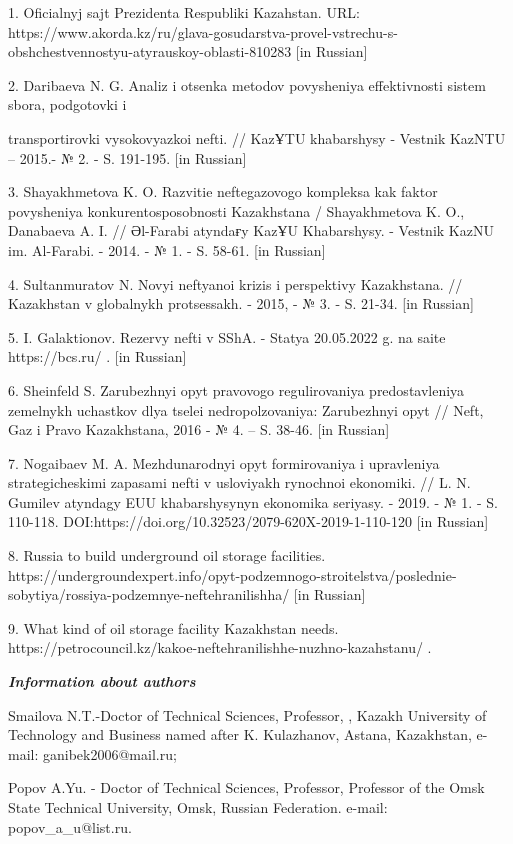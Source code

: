 \begin{noparindent}
1. Oficial\textquotesingle nyj sajt Prezidenta Respubliki Kazahstan.
URL:
https://www.akorda.kz/ru/glava-gosudarstva-provel-vstrechu-s-obshchestvennostyu-atyrauskoy-oblasti-810283
{[}in Russian{]}

2. Daribaeva N. G. Analiz i otsenka metodov povysheniya effektivnosti
sistem sbora, podgotovki i

transportirovki vysokovyazkoi nefti. //
KazҰTU khabarshysy - Vestnik KazNTU -- 2015.- № 2. - S. 191-195. {[}in
Russian{]}

3. Shayakhmetova K. O. Razvitie neftegazovogo kompleksa kak faktor
povysheniya konkurentosposobnosti Kazakhstana / Shayakhmetova K. O.,
Danabaeva A. I. // Әl-Farabi atyndaғy KazҰU Khabarshysy. - Vestnik KazNU
im. Al\textquotesingle-Farabi. - 2014. - № 1. - S. 58-61. {[}in
Russian{]}

4. Sultanmuratov N. Novyi neftyanoi krizis i perspektivy Kazakhstana. //
Kazakhstan v global\textquotesingle nykh protsessakh. - 2015, - № 3. -
S. 21-34. {[}in Russian{]}

5. I. Galaktionov. Rezervy nefti v SShA. - Stat\textquotesingle ya
20.05.2022 g. na saite https://bcs.ru/ . {[}in Russian{]}

6. Sheinfel\textquotesingle d S. Zarubezhnyi opyt pravovogo
regulirovaniya predostavleniya zemel\textquotesingle nykh uchastkov dlya
tselei nedropol\textquotesingle zovaniya: Zarubezhnyi opyt //
Neft\textquotesingle, Gaz i Pravo Kazakhstana, 2016 - № 4. -- S. 38-46.
{[}in Russian{]}

7. Nogaibaev M. A. Mezhdunarodnyi opyt formirovaniya i upravleniya
strategicheskimi zapasami nefti v usloviyakh rynochnoi ekonomiki. // L.
N. Gumilev atyndagy EUU khabarshysynyn ekonomika seriyasy. - 2019. - №
1. - S. 110-118. DOI:https://doi.org/10.32523/2079-620X-2019-1-110-120
{[}in Russian{]}

8. Russia to build underground oil storage facilities.
https://undergroundexpert.info/opyt-podzemnogo-stroitelstva/poslednie-sobytiya/rossiya-podzemnye-neftehranilishha/
{[}in Russian{]}

9. What kind of oil storage facility Kazakhstan needs.
https://petrocouncil.kz/kakoe-neftehranilishhe-nuzhno-kazahstanu/ .
\end{noparindent}

\emph{{\bfseries Information about authors}}

\begin{noparindent}
Smailova N.T.-Doctor of Technical Sciences, Professor, , Kazakh
University of Technology and Business named after K. Kulazhanov, Astana,
Kazakhstan, e-mail: ganibek2006@mail.ru;

Popov A.Yu. - Doctor of Technical Sciences, Professor, Professor of the
Omsk State Technical University, Omsk, Russian Federation. e-mail:
popov\_a\_u@list.ru.
\end{noparindent}

